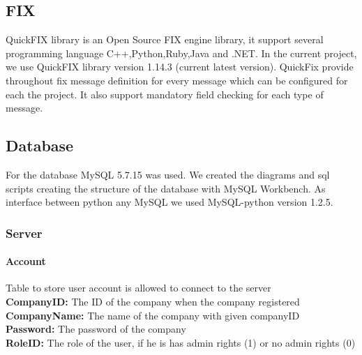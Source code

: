\documentclass[a4paper, 11pt]{article}
\begin{document}
\subsection*{FIX}
QuickFIX library is an Open Source FIX engine library, it support several programming language C++,Python,Ruby,Java and .NET. 
In the current project, we use QuickFIX library version 1.14.3 (current latest version). QuickFix provide throughout fix message definition for every message which can be configured for each the project.
It also support mandatory field checking for each type of message.

\subsection*{Database}

For the database MySQL 5.7.15 was used. We created the diagrams and sql scripts creating the structure of the database with MySQL Workbench.
As interface between python any MySQL we used MySQL-python version 1.2.5.
\subsubsection*{Server}

\noindent
{}

\paragraph*{Account}
Table to store user account is allowed to connect to the server
 \\
\textbf{CompanyID:} The ID of the company when the company registered
 \\
\textbf{CompanyName:} The name of the company with given companyID
 \\
\textbf{Password:} The password of the company
 \\
\textbf{RoleID:} The role of the user, if he is has admin rights (1) or no admin rights (0)
 
\end{document}
